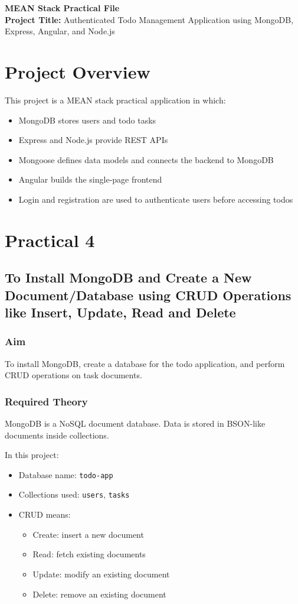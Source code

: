 \documentclass[12pt,a4paper]{article}
\begin{document}
\begin{center}
{\LARGE \textbf{MEAN Stack Practical File}}\\[1em]
{\large \textbf{Project Title:} Authenticated Todo Management Application using MongoDB, Express, Angular, and Node.js}
\end{center}

\section*{Project Overview}
This project is a MEAN stack practical application in which:
\begin{itemize}
  \item MongoDB stores users and todo tasks
  \item Express and Node.js provide REST APIs
  \item Mongoose defines data models and connects the backend to MongoDB
  \item Angular builds the single-page frontend
  \item Login and registration are used to authenticate users before accessing todos
\end{itemize}

\section*{Practical 4}
\subsection*{To Install MongoDB and Create a New Document/Database using CRUD Operations like Insert, Update, Read and Delete}

\subsubsection*{Aim}
To install MongoDB, create a database for the todo application, and perform CRUD operations on task documents.

\subsubsection*{Required Theory}
MongoDB is a NoSQL document database. Data is stored in BSON-like documents inside collections.

In this project:
\begin{itemize}
  \item Database name: \texttt{todo-app}
  \item Collections used: \texttt{users}, \texttt{tasks}
  \item CRUD means:
  \begin{itemize}
    \item Create: insert a new document
    \item Read: fetch existing documents
    \item Update: modify an existing document
    \item Delete: remove an existing document
  \end{itemize}
\end{itemize}
\end{document}
